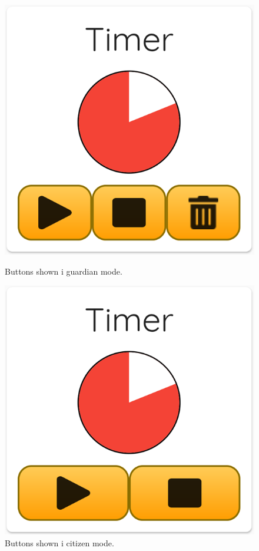 \begin{figure}[H]
\center
{}
  \includegraphics[width=\linewidth]{sections/4Sprint/images/timerButtonsGuardian.png}
  \caption{Buttons shown i guardian mode.}
  \label{fig:timerButtonsGuardian}
\endminipage \quad
{}
  \includegraphics[width=\linewidth]{sections/4Sprint/images/timerButtonsCitizen.png}
  \caption{Buttons shown i citizen mode.}
  \label{fig:timerButtonsCitizen}
\endminipage
\end{figure}

